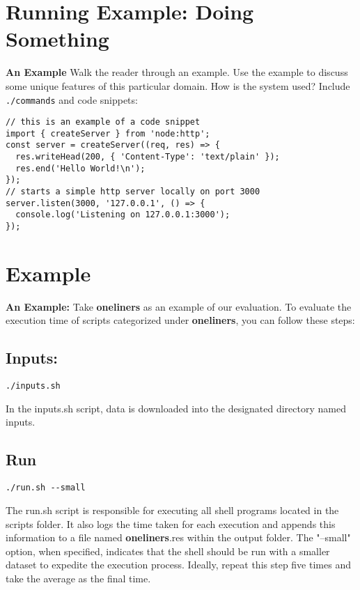 \documentclass[sigplan, screen, 10pt]{acmart}
\begin{document}
\section{Running Example: Doing Something}
\label{ex}

\textbf{An Example} Walk the reader through an example.
Use the example to discuss some unique features of this particular domain.
How is the system used?
Include \texttt{./commands} and code snippets:

\begin{verbatim}
// this is an example of a code snippet
import { createServer } from 'node:http';
const server = createServer((req, res) => {
  res.writeHead(200, { 'Content-Type': 'text/plain' });
  res.end('Hello World!\n');
});
// starts a simple http server locally on port 3000
server.listen(3000, '127.0.0.1', () => {
  console.log('Listening on 127.0.0.1:3000');
});
\end{verbatim}

\section{Example}
\label{ex}

\textbf{An Example:}
Take \textbf{oneliners} as an example of our evaluation. To evaluate the execution time of scripts categorized under \textbf{oneliners}, you can follow these steps:
\subsection{Inputs:}
\begin{verbatim}
./inputs.sh
\end{verbatim}
In the inputs.sh script, data is downloaded into the designated directory named inputs.
\subsection{Run}
\begin{verbatim}
./run.sh --small
\end{verbatim}
The run.sh script is responsible for executing all shell programs located in the scripts folder. It also logs the time taken for each execution and appends this information to a file named \textbf{oneliners}.res within the output folder. The "--small" option, when specified, indicates that the shell should be run with a smaller dataset to expedite the execution process. Ideally, repeat this step five times and take the average as the final time.
\end{document}

